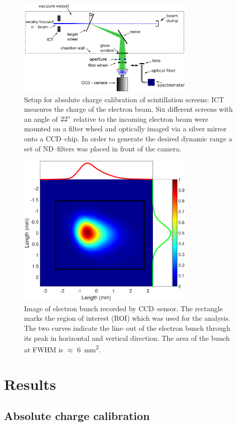 \documentclass[%
reprint,
amsmath,
amssymb,
aip,
rsi, 
numerical,
floatfix,
]{revtex4-1}
\begin{document}
\begin{figure}
\includegraphics[width=8.5cm]{./Figures/Setup_V3}%
\caption{\label{fig:Setup}Setup for absolute charge calibration of scintillation screens: ICT measures the charge of the electron beam. 
Six different screens with an angle of $22\degree$ relative to the incoming electron beam were mounted on a filter wheel and optically imaged via a silver mirror onto a CCD--chip.
In order to generate the desired dynamic range a set of ND--filters was placed in front of the camera.}
\end{figure}
\begin{figure}
\includegraphics[width=8.5cm]{./Figures/electron_bunch}%
\caption{\label{fig:electron_bunch}
Image of electron bunch recorded by CCD–sensor. 
The rectangle marks the region of interest (ROI) which was used for the analysis. 
The two curves indicate the line--out of the electron bunch through its peak in horizontal and vertical direction. 
The area of the bunch at FWHM is $\approx$ \SI{6}{\square\milli\meter}.}
\end{figure}

\section{\label{Res} Results}
\subsection{\label{Ac} Absolute charge calibration}
\end{document}
